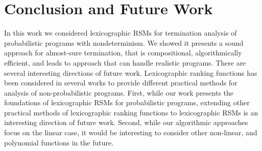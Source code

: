 \section{Conclusion and Future Work}
In this work we considered lexicographic RSMs for termination analysis of probabilistic
programs with nondeterminism.
We showed it presents a sound approach for almost-sure termination, that is compositional,
algorithmically efficient, and leads to approach that can handle realistic programs.
There are several interesting directions of future work.
Lexicographic ranking functions has been considered in several works to 
provide different practical methods for analysis of non-probabilistic programs.
First, while our work presents the foundations of lexicographic RSMs for probabilistic 
programs, extending other practical methods of lexicographic ranking functions to 
lexicographic RSMs is an interesting direction of future work.
Second, while our algorithmic approaches focus on the linear case, it would be interesting
to consider other non-linear, and polynomial functions in the future.





